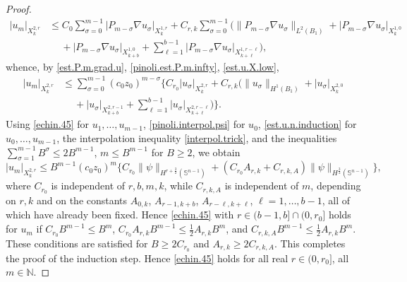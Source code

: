 \documentclass[10pt,reqno,a4paper]{article}
\numberwithin{equation}{section}
\theoremstyle{plain}
\theoremstyle{definition}
\newcommand{\N}{{\mathbb N}}
\renewcommand{\S}{{\mathbb S}}
\newcommand{\grad}{\nabla}
\begin{document}
\begin{proof}
\begin{align*}
|u_m|_{X^{2,r}_k} 
& \leq C_0 \sum_{\sigma = 0}^{m-1} |P_{m-\sigma} \grad u_\sigma|_{X^{1,r}_k} 
+ C_{r,k} \sum_{\sigma = 0}^{m-1} \Big( \| P_{m-\sigma} \grad u_\sigma \|_{L^2(B_1)}
+ |P_{m-\sigma} \grad u_\sigma|_{X^{1,0}_{k}}
\\ & \quad \ 
+ |P_{m-\sigma} \grad u_\sigma|_{X^{1,0}_{k+b}} 
+ \sum_{\ell=1}^{b-1} |P_{m-\sigma} \grad u_\sigma|_{X^{1,r-\ell}_{k+\ell}} \Big),
\end{align*}
whence, by \eqref{est.P.m.grad.u}, \eqref{pinoli.est.P.m.infty}, \eqref{est.u.X.low}, 
\begin{align*}
|u_m|_{X^{2,r}_k} 
& \leq \sum_{\sigma = 0}^{m-1} (c_0 z_0)^{m-\sigma} 
\Big\{ C_{r_0} |u_\sigma|_{X^{2,r}_k} 
+ C_{r,k} \Big( \| u_\sigma \|_{H^1(B_1)} 
+ |u_\sigma|_{X^{2,0}_{k}} 
\\ & \quad \ 
+ |u_\sigma|_{X^{2,r-1}_{k+b}}
+ \sum_{\ell=1}^{b-1} |u_\sigma|_{X^{2,r-\ell}_{k+\ell}} \Big) \Big\}.
\end{align*}
Using \eqref{echin.45} for $u_1, \ldots, u_{m-1}$, 
\eqref{pinoli.interpol.psi} for $u_0$,
\eqref{est.u.n.induction} for $u_0, \ldots, u_{m-1}$, 
the interpolation inequality \eqref{interpol.trick}, 
and the inequalities $\sum_{\sigma=1}^{m-1} B^\sigma \leq 2 B^{m-1}$, 
$m \leq B^{m-1}$ for $B \geq 2$, we obtain 
\begin{equation} \label{pinoli.61}
|u_m|_{X^{2,r}_k} 
\leq B^{m-1} (c_0 z_0)^m 
\{ C_{r_0} \| \psi \|_{H^{r + \frac32}(\S^{n-1})} 
+ (C_{r_0} A_{r,k} + C_{r,k,A}) \| \psi \|_{H^{\frac32}(\S^{n-1})} \},
\end{equation}
where $C_{r_0}$ is independent of $r,b,m,k$, 
while $C_{r,k,A}$ is independent of $m$, depending on $r,k$ and on the constants 
$A_{0,k}$, $A_{r-1,k+b}$, 
$A_{r-\ell, k + \ell}$, 
$\ell = 1, \ldots, b-1$, 
all of which have already been fixed. 
Hence \eqref{echin.45} with $r \in (b-1,b] \cap (0,r_0]$ holds for $u_m$ if 
$C_{r_0} B^{m-1} \leq B^m$, 
$C_{r_0} A_{r,k} B^{m-1} \leq \frac12 A_{r,k} B^m$,
and $C_{r,k,A} B^{m-1} \leq \frac12 A_{r,k} B^m$. 
These conditions are satisfied for $B \geq 2 C_{r_0}$ 
and $A_{r,k} \geq 2 C_{r,k,A}$. 
This completes the proof of the induction step. 
Hence \eqref{echin.45} holds for all real $r \in (0,r_0]$, all $m \in \N$. 

\medskip


\end{proof}
\end{document}
